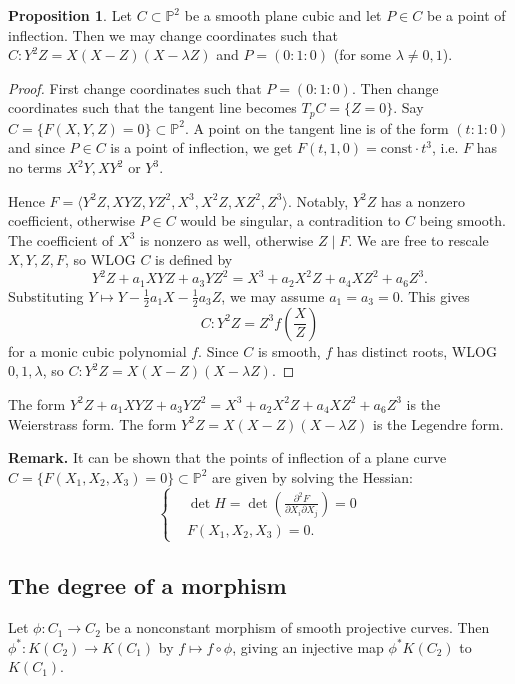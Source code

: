 \documentclass{article}
\theoremstyle{definition}
\newtheorem{prop}[theorem]{Proposition}
\begin{document}
\begin{prop}\label{prop2.2}
    Let $C \subset \mathbb{P}^2$ be a smooth plane cubic and let $P \in C$ be a point of inflection. Then we may change coordinates such that $C : Y^2Z = X(X-Z)(X-\lambda Z)$ and $P = (0:1:0)$ (for some $\lambda \neq 0,1$).
\end{prop}
\begin{proof}
    First change coordinates such that $P = (0:1:0)$. Then change coordinates such that the tangent line becomes $T_p C = \{Z = 0\}$. Say $C = \{F(X,Y,Z) = 0\} \subset  \mathbb{P}^2$. A point on the tangent line is of the form $(t:1:0)$ and since $P \in C$ is a point of inflection, we get $F(t,1,0) = \text{const}\cdot t^3$, i.e. $F$ has no terms $X^2Y, XY^2$ or $Y^3$.
    \vspace{1mm}
     
    Hence $F = \langle Y^2Z, XYZ, YZ^2, X^3, X^2Z, XZ^2, Z^3 \rangle$. Notably, $Y^2Z$ has a nonzero coefficient, otherwise $P \in C$ would be singular, a contradition to $C$ being smooth. The coefficient of $X^3$ is nonzero as well, otherwise $Z \mid F$. We are free to rescale $X,Y,Z,F$, so WLOG $C$ is defined by \[
    Y^2Z + a_1 XYZ + a_3 YZ^2 = X^3 + a_2 X^2 Z + a_4 XZ^2 + a_6 Z^3.
    \]
    Substituting $Y \mapsto Y - \frac{1}{2}a_1 X - \frac{1}{2}a_3 Z$, we may assume $a_1 = a_3 = 0$. This gives \[
    C : Y^2Z = Z^3 f \left(\frac{X}{Z}\right)
    \]
    for a monic cubic polynomial $f$. Since $C$ is smooth, $f$ has distinct roots, WLOG $0,1,\lambda$, so $C: Y^2Z = X(X-Z)(X-\lambda Z)$.
\end{proof}
The form $Y^2Z + a_1 XYZ + a_3 YZ^2 = X^3 + a_2 X^2 Z + a_4 XZ^2 + a_6 Z^3$ is the Weierstrass form. The form $ Y^2Z = X(X-Z)(X-\lambda Z)$ is the Legendre form.

\textbf{Remark.} It can be shown that the points of inflection of a plane curve $C = \{F(X_1,X_2,X_3) = 0\} \subset \mathbb{P}^2$ are given by solving the Hessian:
\[
\begin{cases}
    &\det H = \det\left(\frac{\partial^2 F}{\partial X_i \partial X_j} \right) = 0\\
    &F(X_1,X_2,X_3) = 0.
\end{cases}
\]
\subsection{The degree of a morphism}
Let $\phi : C_1 \to C_2$ be a nonconstant morphism of smooth projective curves. Then $\phi^* : K(C_2) \to K(C_1)$ by $f \mapsto f \circ \phi$, giving an injective map $\phi^* K(C_2)$ to $K(C_1)$.
\end{document}
